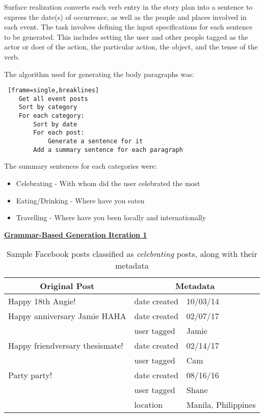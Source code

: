 Surface realization converts each verb entry in the story plan into a sentence to express the date(s) of occurrence, as well as the people and places involved in each event. The task involves defining the input specifications for each sentence to be generated. This includes setting the user and other people tagged as the actor or doer of the action, the particular action, the object, and the tense of the verb.

The algorithm used for generating the body paragraphs was:

\begin{lstlisting} [frame=single,breaklines]
	Get all event posts
	Sort by category
	For each category:
		Sort by date
		For each post:
			Generate a sentence for it
		Add a summary sentence for each paragraph
\end{lstlisting}

The summary sentences for each categories were:
\begin{itemize}
	\item Celebrating - With whom did the user celebrated the most
	\item Eating/Drinking - Where have you eaten
	\item Travelling - Where have you been locally and internationally
\end{itemize}

\underline{\textbf{Grammar-Based Generation Iteration 1}} \newline
\begin{table}[ph!]   
	\centering
	\caption{Sample Facebook posts classified as \textit{celebrating} posts, along with their metadata} \vspace{0.25em}
	\begin{tabular}  {|p{2in}|p{1.5in}|p{1.5in}|}  \hline
    \multicolumn{1}{|c|}{Original Post} & \multicolumn{2}{c|}{Metadata}\\ \hline
	Happy 18th Angie! &  date created & 10/03/14 \\ \hline
	
	{Happy anniversary Jamie HAHA} &  {date created} &{02/07/17} \\\cline{2-1}
	& {user tagged} & {Jamie} \\\hline
	
	{Happy friendversary thesismate!} &  {date created} & {02/14/17} \\\cline{2-1}
	&  {user tagged} &{Cam} \\\hline
	
	{Party party!} &  {date created} & {08/16/16} \\\cline{2-2}
	&  {user tagged} & {Shane} \\\cline{2-2}
	&  {location} & {Manila, Philippines} \\\hline
	
	\end{tabular}
	\label{tab:GrammarRules-celeb}
\end{table}

